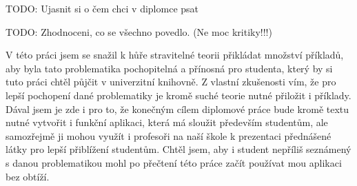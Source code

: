 

TODO: Ujasnit si o čem chci v diplomce psat


TODO: Zhodnoceni, co se všechno povedlo. (Ne moc kritiky!!!)

V této práci jsem se snažil k hůře stravitelné teorii přikládat množství příkladů, aby byla tato problematika pochopitelná a přínosná pro studenta, který by si tuto práci chtěl půjčit v univerzitní knihovně. Z vlastní zkušenosti vím, že pro lepší pochopení dané problematiky je kromě suché teorie nutné přiložit i příklady. Dával jsem je zde i pro to, že konečným cílem diplomové práce bude kromě textu nutné vytvořit i funkční aplikaci, která má sloužit především studentům, ale samozřejmě ji mohou využít i profesoři na naší škole k prezentaci přednášené látky pro lepší přiblížení studentům. Chtěl jsem, aby i student nepříliš seznámený s danou problematikou mohl po přečtení této práce začít používat mou aplikaci bez obtíží.



